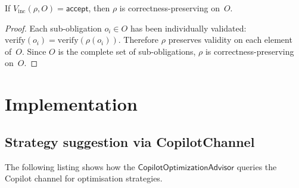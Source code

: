 \documentclass[11pt]{article}
\newcommand{\OptAdv}{\mathsf{CopilotOptimizationAdvisor}}
\begin{document}
\begin{lemma}%
\label{lem:incvalsound}
If $V_{\mathrm{inc}}(\rho, O) = \mathsf{accept}$, then
$\rho$ is correctness-preserving on~$O$.
\end{lemma}
\begin{proof}
Each sub-obligation $o_i \in O$ has been individually
validated: $\mathrm{verify}(o_i) = \mathrm{verify}(\rho(o_i))$.
Therefore $\rho$ preserves validity on each element of~$O$.
Since $O$ is the complete set of sub-obligations, $\rho$
is correctness-preserving on~$O$.
\end{proof}

\section{Implementation}\label{sec:code}

\subsection{Strategy suggestion via CopilotChannel}

The following listing shows how the $\OptAdv$ queries
the Copilot channel for optimisation strategies.
\end{document}
